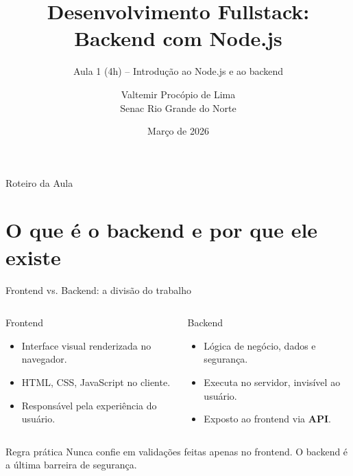 \documentclass[aspectratio=169]{beamer}
\title[Fullstack -- AULA 1]{Desenvolvimento Fullstack: Backend com Node.js}
\subtitle{Aula 1 (4h) -- Introdu\c{c}\~ao ao Node.js e ao backend}
\author[Valtemir Proc\'opio]{Valtemir Proc\'opio de Lima\\Senac Rio Grande do Norte}
\date[2026]{Mar\c{c}o de 2026}
\begin{document}
\begin{frame}[plain]
  \titlepage
\end{frame}

\begin{frame}{Roteiro da Aula}
\tableofcontents
\end{frame}

\section{O que \'{e} o backend e por que ele existe}

\begin{frame}{Frontend vs. Backend: a divis\~ao do trabalho}
\begin{columns}[T]
\begin{block}{Frontend}
\begin{itemize}
  \item Interface visual renderizada no navegador.
  \item HTML, CSS, JavaScript no cliente.
  \item Respons\'avel pela experi\^encia do usu\'ario.
\end{itemize}
\end{block}
\begin{block}{Backend}
\begin{itemize}
  \item L\'ogica de neg\'ocio, dados e seguran\c{c}a.
  \item Executa no servidor, invis\'ivel ao usu\'ario.
  \item Exposto ao frontend via \textbf{API}.
\end{itemize}
\end{block}
\end{columns}
\vspace{0.4em}
\begin{alertblock}{Regra pr\'atica}
Nunca confie em valida\c{c}\~oes feitas apenas no frontend. O backend \'{e} a \'{u}ltima barreira de seguran\c{c}a.
\end{alertblock}
\end{frame}
\end{document}
